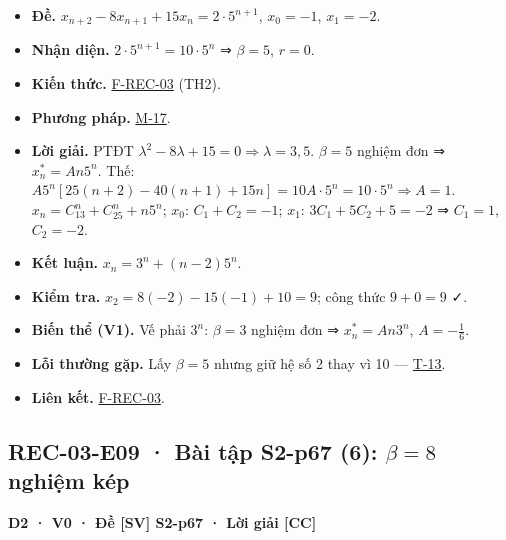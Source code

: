 \documentclass[
  10pt,
  twoside,openany]{book}
\providecommand{\tightlist}{%
  \setlength{\itemsep}{0pt}\setlength{\parskip}{0pt}}
\begin{document}
\begin{itemize}
\tightlist
\item
  \textbf{Đề.} \(x_{n+2}-8x_{n+1}+15x_n=2\cdot5^{n+1}\), \(x_0=-1\),
  \(x_1=-2\).
\item
  \textbf{Nhận diện.} \(2\cdot5^{n+1}=10\cdot5^n\) ⇒ \(\beta=5\),
  \(r=0\).
\item
  \textbf{Kiến thức.} \protect\hyperlink{F-REC-03}{F-REC-03} (TH2).
\item
  \textbf{Phương pháp.} \protect\hyperlink{M-17}{M-17}.
\item
  \textbf{Lời giải.} PTĐT
  \(\lambda^2-8\lambda+15=0\Rightarrow\lambda=3,5\). \(\beta=5\) nghiệm
  đơn ⇒ \(x_n^*=An5^n\). Thế:
  \(A5^n[25(n+2)-40(n+1)+15n]=10A\cdot5^n=10\cdot5^n\Rightarrow A=1\).
  \(x_n=C_13^n+C_25^n+n5^n\); \(x_0\): \(C_1+C_2=-1\); \(x_1\):
  \(3C_1+5C_2+5=-2\) ⇒ \(C_1=1\), \(C_2=-2\).
\item
  \textbf{Kết luận.} \(x_n=3^n+(n-2)5^n\).
\item
  \textbf{Kiểm tra.} \(x_2=8(-2)-15(-1)+10=9\); công thức \(9+0=9\) ✓.
\item
  \textbf{Biến thể (V1).} Vế phải \(3^n\): \(\beta=3\) nghiệm đơn ⇒
  \(x_n^*=An3^n\), \(A=-\frac16\).
\item
  \textbf{Lỗi thường gặp.} Lấy \(\beta=5\) nhưng giữ hệ số 2 thay vì 10
  --- \protect\hyperlink{T-13}{T-13}.
\item
  \textbf{Liên kết.} \protect\hyperlink{F-REC-03}{F-REC-03}.
\end{itemize}

\hypertarget{REC-03-E09}{%
\subsection{\texorpdfstring{REC-03-E09 · Bài tập S2-p67 (6): \(\beta=8\)
nghiệm
kép}{REC-03-E09 · Bài tập S2-p67 (6): \textbackslash beta=8 nghiệm kép}}\label{REC-03-E09}}

\textbf{D2 · V0 · Đề {[}SV{]} S2-p67 · Lời giải {[}CC{]}}
\end{document}
